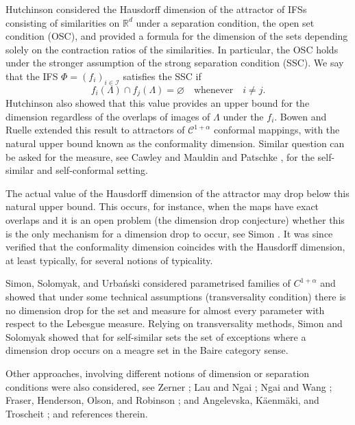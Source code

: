 \documentclass[12pt,]{article}
\theoremstyle{definition}
\theoremstyle{remark}
\newcommand{\0}{\mathbf{0}}
\begin{document}
{Hutchinson \cite{Hutchinson_Attractor_81} considered the Hausdorff dimension of the attractor of
IFSs consisting of similarities on $\mathbb{R}^d$ under a separation condition, the open set
condition (OSC), and provided a formula for the dimension of the sets depending solely on the
contraction ratios of the similarities. In particular, the OSC holds under the stronger assumption
of the strong separation condition (SSC). We say that the IFS $\Phi=(f_i)_{i\in \mathcal{I}}$
satisfies the SSC if
\begin{equation*}
  f_i(\Lambda)\cap f_j(\Lambda) = \varnothing\quad\text{whenever}\quad i\neq j.
\end{equation*}
Hutchinson also showed that this value provides an upper bound for
the dimension regardless of the overlaps of images of $\Lambda$ under the $f_i$.  Bowen
\cite{Bowen75} and Ruelle \cite{Ruelle2004} extended this result to attractors of
$\mathcal{C}^{1+\alpha}$ conformal mappings, with the natural upper bound known as the conformality
dimension. Similar question can be asked for the measure, see Cawley and Mauldin
\cite{CawleyMauldin92} and Patschke \cite{Patzschke97}, for the self-similar and self-conformal
setting. 

The actual value of the Hausdorff dimension of the attractor may drop below this natural upper
bound. This occurs, for instance, when the maps have exact overlaps and it is an open problem (the
dimension drop conjecture) whether this is the only mechanism for a dimension drop to occur, see
Simon \cite{Simon1996}.  It was since verified that the conformality dimension coincides with the
Hausdorff dimension, at least typically, for several notions of typicality.

Simon, Solomyak, and Urba\'nski \cite{SimonSolomyakUrbanski1,SimonSolomyakUrbanski2} considered
parametrised families of $C^{1+\alpha}$ and showed that under some technical assumptions
(transversality condition) there is no dimension drop for the set and measure for almost every
parameter with respect to the Lebesgue measure. Relying on transversality methods, Simon and
Solomyak \cite{SimonSolomyak02} showed that for self-similar sets the set of exceptions where a
dimension drop occurs on a meagre set in the Baire category sense. 

Other approaches, involving different notions of dimension or separation conditions were also
considered, see
Zerner \cite{Zerner1996}; Lau and Ngai \cite{LauNgai1999}; Ngai and Wang \cite{NgaiWang2001}; Fraser,
Henderson, Olson, and Robinson \cite{FHOR2015}; and Angelevska, K\"aenm\"aki, and Troscheit
\cite{AngelevskaKaenmakiTroscheit2020}; and references therein.

}
\end{document}
